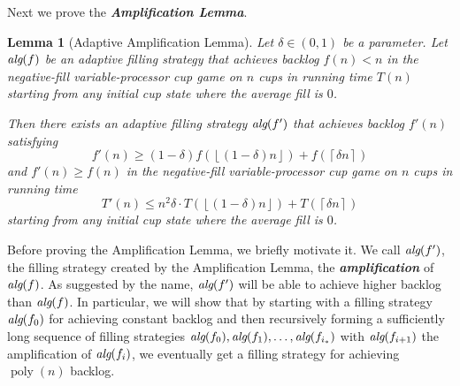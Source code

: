 \documentclass[twocolumn]{article}[10pt]
\newcommand{\defn}[1]{{\textit{\textbf{\boldmath #1}}}\xspace}
\DeclareMathOperator{\poly}{\text{poly}}
\newcommand{\alg}[1]{\textit{\text{alg}}({#1})}
\newcommand{\floor}[1]{\left\lfloor #1 \right\rfloor}
\newcommand{\ceil}[1]{\left\lceil #1 \right\rceil}
\newtheorem{lemma}{Lemma}
\begin{document}

Next we prove the \defn{Amplification Lemma}.
\begin{lemma}[Adaptive Amplification Lemma]\label{lem:adaptiveAmplification}
  Let $\delta\in(0,1)$ be a parameter.
  Let $\alg{f}$ be an adaptive filling strategy that 
  achieves backlog $f(n) < n$ in the negative-fill variable-processor cup game
  on $n$ cups in running time $T(n)$ starting from any initial
  cup state where the average fill is $0$.

  Then there exists an adaptive filling strategy $\alg{f'}$ that
  achieves backlog $f'(n)$ satisfying 
  $$f'(n) \ge (1-\delta)f(\floor{(1-\delta)n}) + f(\ceil{\delta n}) $$
  and $f'(n) \ge f(n)$
  in the negative-fill variable-processor cup game on $n$ cups in running time 
  $$T'(n) \le n^2 \delta \cdot T(\floor{(1-\delta)n}) + T(\ceil{\delta n})$$
  starting from any initial cup state where the average fill is $0$.
\end{lemma}

Before proving the Amplification Lemma, we briefly motivate it. 
We call $\alg{f'}$, the filling strategy created by the Amplification
Lemma, the \defn{amplification} of $\alg{f}$.
As suggested by the name, $\alg{f'}$ will be able to achieve
higher backlog than $\alg{f}$. In particular, we
will show that by starting with a filling strategy $\alg{f_0}$ for achieving
constant backlog and then recursively forming a sufficiently
long sequence of filling strategies $\alg{f_0}, \alg{f_1},
\ldots, \alg{f_{i_*}}$ with
$\alg{f_{i+1}}$ the amplification of $\alg{f_i}$, we eventually
get a filling strategy for achieving $\poly(n)$ backlog.
  
\end{document}
